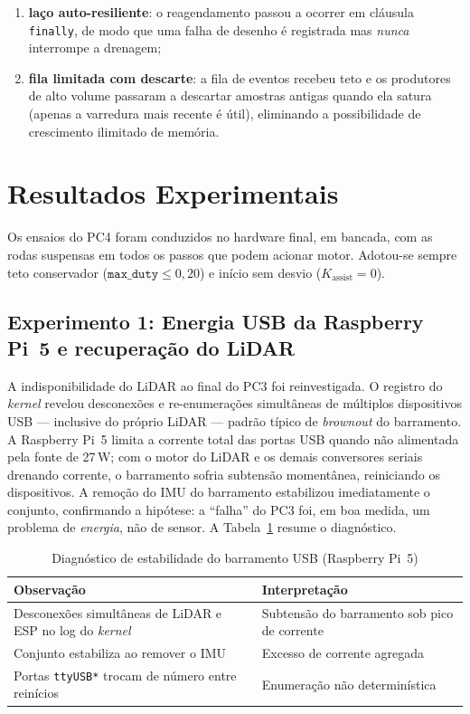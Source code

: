 \documentclass[conference]{IEEEtran}
\begin{document}
\begin{enumerate}
\item \textbf{laço auto-resiliente}: o reagendamento passou a ocorrer em
cláusula \texttt{finally}, de modo que uma falha de desenho é registrada mas
\emph{nunca} interrompe a drenagem;
\item \textbf{fila limitada com descarte}: a fila de eventos recebeu teto e os
produtores de alto volume passaram a descartar amostras antigas quando ela
satura (apenas a varredura mais recente é útil), eliminando a possibilidade de
crescimento ilimitado de memória.
\end{enumerate}

\section{Resultados Experimentais}

Os ensaios do PC4 foram conduzidos no hardware final, em bancada, com as rodas
suspensas em todos os passos que podem acionar motor. Adotou-se sempre teto
conservador ($\texttt{max\_duty} \le 0{,}20$) e início sem desvio
($K_{\text{assist}}=0$).

\subsection{Experimento 1: Energia USB da Raspberry Pi~5 e recuperação do LiDAR}

A indisponibilidade do LiDAR ao final do PC3 foi reinvestigada. O registro do
\emph{kernel} revelou desconexões e re-enumerações simultâneas de múltiplos
dispositivos USB --- inclusive do próprio LiDAR --- padrão típico de
\emph{brownout} do barramento. A Raspberry Pi~5 limita a corrente total das
portas USB quando não alimentada pela fonte de 27\,W; com o motor do LiDAR e
os demais conversores seriais drenando corrente, o barramento sofria subtensão
momentânea, reiniciando os dispositivos. A remoção do IMU do barramento
estabilizou imediatamente o conjunto, confirmando a hipótese: a ``falha'' do
PC3 foi, em boa medida, um problema de \emph{energia}, não de sensor. A
Tabela~\ref{tab:usb} resume o diagnóstico.

\begin{table}[!t]
\caption{Diagnóstico de estabilidade do barramento USB (Raspberry Pi~5)}
\label{tab:usb}
\centering
\footnotesize
\renewcommand{\arraystretch}{1.2}
\begin{tabular}{@{}p{}p{}@{}}
\hline
\textbf{Observação} & \textbf{Interpretação} \\
\hline
Desconexões simultâneas de LiDAR e ESP no log do \emph{kernel} & Subtensão do barramento sob pico de corrente \\
Conjunto estabiliza ao remover o IMU & Excesso de corrente agregada \\
Portas \texttt{ttyUSB*} trocam de número entre reinícios & Enumeração não determinística \\
\hline
\end{tabular}
\end{table}
\end{document}
